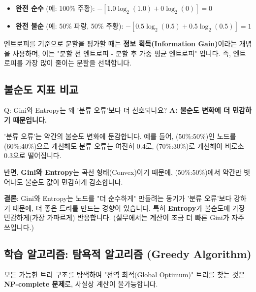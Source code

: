 \documentclass[11pt,a4paper]{book}
\theoremstyle{definition}
\begin{document}
\begin{itemize}
    \item \textbf{완전 순수} (예: 100\% 주황): $- [ 1.0 \log_2(1.0) + 0 \log_2(0) ] = 0$
    \item \textbf{완전 불순} (예: 50\% 파랑, 50\% 주황): $- [ 0.5 \log_2(0.5) + 0.5 \log_2(0.5) ] = 1$
\end{itemize}
엔트로피를 기준으로 분할을 평가할 때는 \textbf{정보 획득(Information Gain)}이라는 개념을 사용하며, 이는 "분할 전 엔트로피 - 분할 후 가중 평균 엔트로피" 입니다. 즉, 엔트로피를 가장 많이 줄이는 분할을 선택합니다.

\subsection{불순도 지표 비교}


\begin{tcolorbox}{Q: Gini와 Entropy는 왜 '분류 오류'보다 더 선호되나요?}
    \textbf{A: 불순도 변화에 더 민감하기 때문입니다.}

    '분류 오류'는 약간의 불순도 변화에 둔감합니다. 예를 들어, (50\%:50\%)인 노드를 (60\%:40\%)으로 개선해도 분류 오류는 여전히 $0.4$로, (70\%:30\%)로 개선해야 비로소 $0.3$으로 떨어집니다.

    반면, \textbf{Gini와 Entropy}는 곡선 형태(Convex)이기 때문에, (50\%:50\%)에서 약간만 벗어나도 불순도 값이 민감하게 감소합니다.
    
    \textbf{결론}: Gini와 Entropy는 노드를 "더 순수하게" 만들려는 동기가 '분류 오류'보다 강하기 때문에, 더 좋은 트리를 만드는 경향이 있습니다. 특히 \textbf{Entropy}가 불순도에 가장 민감하게(가장 가파르게) 반응합니다. (실무에서는 계산이 조금 더 빠른 Gini가 자주 쓰입니다.)
\end{tcolorbox}

\subsection{학습 알고리즘: 탐욕적 알고리즘 (Greedy Algorithm)}

모든 가능한 트리 구조를 탐색하여 "전역 최적(Global Optimum)" 트리를 찾는 것은 \textbf{NP-complete 문제}로, 사실상 계산이 불가능합니다.
\end{document}
